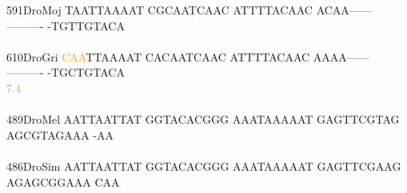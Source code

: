 \documentclass[11pt,twoside,reqno,a4paper]{article}
\begin{document}
{591\hspace*{1\charwidth}DroMoj	TAATTAAAAT	CGCAATCAAC	ATTTTACAAC	ACAA------	----------	-TGTTGTACA	\\
\hspace*{4\charwidth}\hspace*{7\charwidth}\hspace*{1\charwidth}\hspace*{1\charwidth}\hspace*{1\charwidth}\hspace*{1\charwidth}\hspace*{1\charwidth}\hspace*{1\charwidth}\\
610\hspace*{1\charwidth}DroGri	\textcolor{orange}{C}\textcolor{orange}{A}\textcolor{orange}{A}TTAAAAT	CACAATCAAC	ATTTTACAAC	AAAA------	----------	-TGCTGTACA	\\
\hspace*{4\charwidth}\hspace*{7\charwidth}\hspace*{0\charwidth}\textcolor{orange}{7.4}\hspace*{1\charwidth}\hspace*{1\charwidth}\hspace*{1\charwidth}\hspace*{1\charwidth}\hspace*{1\charwidth}\hspace*{1\charwidth}\\
\\
489\hspace*{1\charwidth}DroMel	AATTAATTAT	GGTACACGGG	AAATAAAAAT	GAGTTCGTAG	AGCGTAGAAA	-AA\\
\hspace*{4\charwidth}\hspace*{7\charwidth}\hspace*{1\charwidth}\hspace*{1\charwidth}\hspace*{1\charwidth}\hspace*{1\charwidth}\hspace*{1\charwidth}\\
486\hspace*{1\charwidth}DroSim	AATTAATTAT	GGTACACGGG	AAATAAAAAT	GAGTTCGAAG	AGAGCGGAAA	CAA\\
\hspace*{4\charwidth}\hspace*{7\charwidth}\hspace*{1\charwidth}\hspace*{1\charwidth}\hspace*{1\charwidth}\hspace*{1\charwidth}\hspace*{1\charwidth}\\
}
\end{document}
